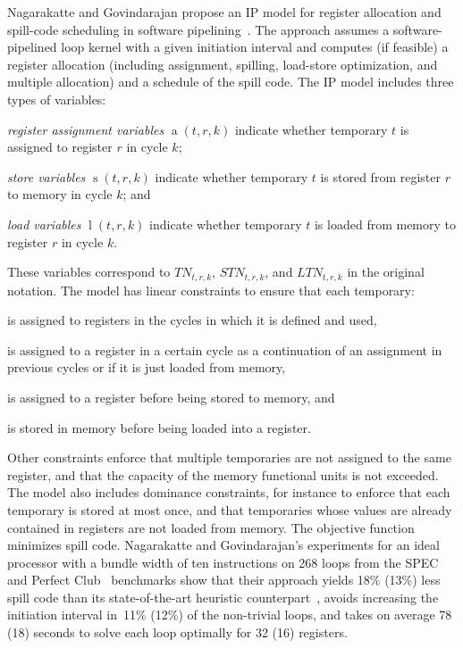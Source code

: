 \documentclass[acmsmall,authorversion,nonacm]{acmart}
\newcommand{\noMathVar}[2]{\operatorname{#1}(#2)}
\newcommand{\var}[2]{$\noMathVar{#1}{#2}$}
\begin{document}
Nagarakatte and Govindarajan propose an IP model for register
allocation and spill-code scheduling in software
pipelining~\cite{Nagarakatte2007}.
The approach assumes a software-pipelined loop kernel with a given
initiation interval and computes (if feasible) a register allocation
(including assignment, spilling, load-store optimization, and multiple
allocation) and a schedule of the spill code.
The IP model includes three types of variables:
\begin{inparaitem}[]
\item \emph{register assignment variables} \var{a}{t,r,k}
  indicate whether temporary $t$ is assigned to register
  $r$ in cycle $k$;
\item \emph{store variables} \var{s}{t,r,k} indicate
  whether temporary $t$ is stored from register $r$ to
  memory in cycle $k$; and
\item \emph{load variables} \var{l}{t,r,k} indicate
  whether temporary $t$ is loaded from memory to register
  $r$ in cycle $k$.
\end{inparaitem}
These variables correspond to $TN_{t,r,k}$, $STN_{t,r,k}$, and
$LTN_{t,r,k}$ in the original notation.
The model has linear constraints to ensure that each temporary:
\begin{inparaitem}[]
\item is assigned to registers in the cycles in which it is defined
  and used,
\item is assigned to a register in a certain cycle as a continuation
  of an assignment in previous cycles or if it is just loaded from
  memory,
\item is assigned to a register before being stored to memory, and
\item is stored in memory before being loaded into a register.
\end{inparaitem}
Other constraints enforce that multiple temporaries are not assigned
to the same register, and that the capacity of the memory functional
units is not exceeded.
The model also includes dominance constraints, for instance to enforce
that each temporary is stored at most once, and that temporaries whose
values are already contained in registers are not loaded from memory.
The objective function minimizes spill code.
Nagarakatte and Govindarajan's experiments for an ideal processor with
a bundle width of ten instructions on 268 loops from the
SPEC~\cite{CPU} and Perfect Club~\cite{Berry1988} benchmarks show that
their approach yields 18\% (13\%) less spill code than its
state-of-the-art heuristic counterpart~\cite{Zalamea2000}, avoids
increasing the initiation interval in~11\% (12\%) of the non-trivial
loops, and takes on average 78 (18) seconds to solve each loop
optimally for 32 (16) registers.
\end{document}
